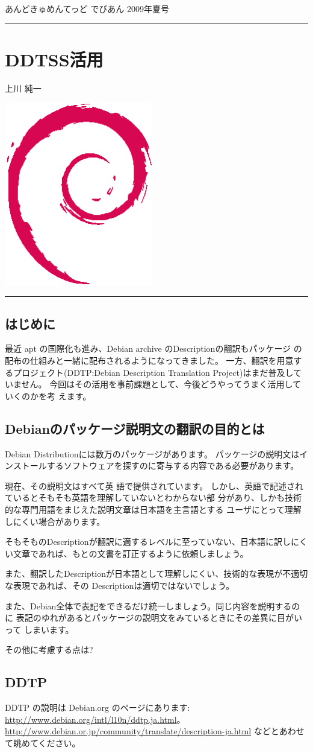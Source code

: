 \documentclass[mingoth,a4paper]{jsarticle}
\renewcommand{\dancersection}[2]{%
\newpage
あんどきゅめんてっど でびあん 2009年夏号
%
\vspace{0.1mm}\\
{\color{dancerlightblue}\rule{\hsize}{2mm}}

%
%
\begin{minipage}[t]{0.6\hsize}
\color{dancerdarkblue}
\vspace{1cm}
\section{#1}
\hfill{}#2\\
\end{minipage}
\begin{minipage}[t]{0.4\hsize}
\vspace{-2cm}
\hfill{}\includegraphics[height=8cm]{image200502/openlogo-nd.eps}\\
\vspace{-5cm}
\end{minipage}
%
%
{\color{dancerdarkblue}\rule{0.74\hsize}{2mm}}
%
\vspace{2cm}
}
\begin{document}
\begin{commandline}
\dancersection{DDTSS活用}{上川 純一}

\subsection{はじめに}

最近 apt の国際化も進み、Debian archive のDescriptionの翻訳もパッケージ
の配布の仕組みと一緒に配布されるようになってきました。
一方、翻訳を用意するプロジェクト(DDTP:Debian Description Translation
Project)はまだ普及していません。
今回はその活用を事前課題として、今後どうやってうまく活用していくのかを考
えます。

\subsection{Debianのパッケージ説明文の翻訳の目的とは}

Debian Distributionには数万のパッケージがあります。
パッケージの説明文はインストールするソフトウェアを探すのに寄与する内容である必要があります。

現在、その説明文はすべて英
語で提供されています。
しかし、英語で記述されているとそもそも英語を理解していないとわからない部
分があり、しかも技術的な専門用語をまじえた説明文章は日本語を主言語とする
ユーザにとって理解しにくい場合があります。

そもそものDescriptionが翻訳に適するレベルに至っていない、日本語に訳しにく
い文章であれば、もとの文書を訂正するように依頼しましょう。

また、翻訳したDescriptionが日本語として理解しにくい、技術的な表現が不適切な表現であれば、その
Descriptionは適切ではないでしょう。

また、Debian全体で表記をできるだけ統一しましょう。同じ内容を説明するのに
表記のゆれがあるとパッケージの説明文をみているときにその差異に目がいって
しまいます。

その他に考慮する点は?

\subsection{DDTP}

DDTP の説明は Debian.org のページにあります: 
\url{http://www.debian.org/intl/l10n/ddtp.ja.html}。
\url{http://www.debian.or.jp/community/translate/description-ja.html}
などとあわせて眺めてください。


\end{commandline}
\end{document}
